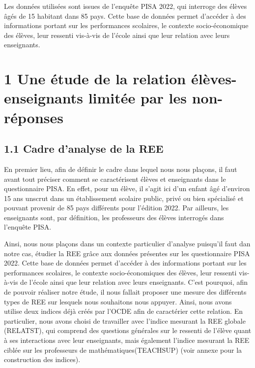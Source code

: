 \documentclass[
  french,
  11pt,
  a4paper,
  oneside]{report}
\begin{document}
Les données utilisées sont issues de l'enquête PISA 2022, qui interroge
des élèves âgés de 15 habitant dans 85 pays. Cette base de données
permet d'accéder à des informations portant sur les performances
scolaires, le contexte socio-économique des élèves, leur ressenti
vis-à-vis de l'école ainsi que leur relation avec leurs enseignants.

\chapter{1 Une étude de la relation élèves-enseignants limitée par les
non-réponses}\label{une-uxe9tude-de-la-relation-uxe9luxe8ves-enseignants-limituxe9e-par-les-non-ruxe9ponses}

\section{1.1 Cadre d'analyse de la REE}\label{cadre-danalyse-de-la-ree}

En premier lieu, afin de définir le cadre dans lequel nous nous plaçons,
il faut avant tout préciser comment se caractérisent élèves et
enseignants dans le questionnaire PISA. En effet, pour un élève, il
s'agit ici d'un enfant âgé d'environ 15 ans unscrut dans un
établissement scolaire public, privé ou bien spécialisé et pouvant
provenir de 85 pays différents pour l'édition 2022. Par ailleurs, les
enseignants sont, par définition, les professeurs des élèves interrogés
dans l'enquête PISA.

Ainsi, nous nous plaçons dans un contexte particulier d'analyse
puisqu'il faut dan notre cas, étudier la REE grâce aux données présentes
sur les questionnaire PISA 2022. Cette base de données permet d'accéder
à des informations portant sur les performances scolaires, le contexte
socio-économiques des élèves, leur ressenti vis-à-vis de l'école ainsi
que leur relation avec leurs enseignants. C'est pourquoi, afin de
pouvoir réaliser notre étude, il nous fallait proposer une mesure des
différents types de REE sur lesquels nous souhaitons nous appuyer.
Ainsi, nous avons utilise deux indices déjà créés par l'OCDE afin de
caractérier cette relation. En particulier, nous avons choisi de
travailler avec l'indice mesurant la REE globale (RELATST), qui comprend
des questions générales sur le ressenti de l'élève quant à ses
interactions avec leur enseignants, mais également l'indice mesurant la
REE ciblée sur les professeurs de mathématiques(TEACHSUP) (voir annexe
pour la construction des indices).
\end{document}
